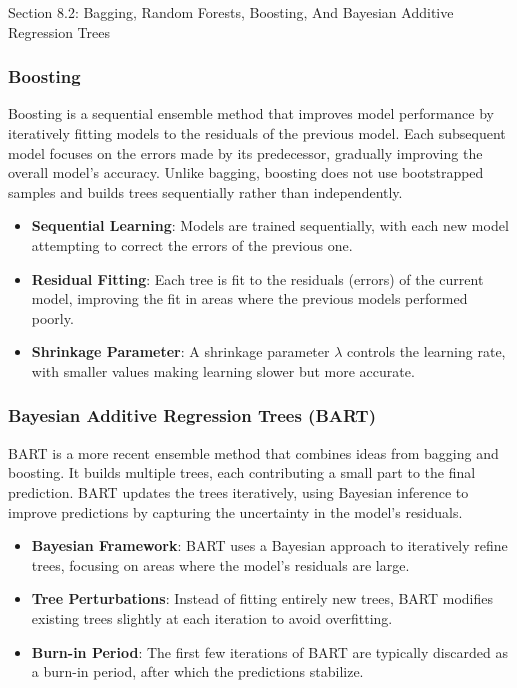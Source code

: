 \begin{notes}{Section 8.2: Bagging, Random Forests, Boosting, And Bayesian Additive Regression Trees}
    \subsubsection*{Boosting}
    
    Boosting is a sequential ensemble method that improves model performance by iteratively fitting models to the residuals of the previous model. Each subsequent model focuses on the errors made by 
    its predecessor, gradually improving the overall model's accuracy. Unlike bagging, boosting does not use bootstrapped samples and builds trees sequentially rather than independently.
    
    \begin{highlight}
        \begin{itemize}
            \item \textbf{Sequential Learning}: Models are trained sequentially, with each new model attempting to correct the errors of the previous one.
            \item \textbf{Residual Fitting}: Each tree is fit to the residuals (errors) of the current model, improving the fit in areas where the previous models performed poorly.
            \item \textbf{Shrinkage Parameter}: A shrinkage parameter \(\lambda\) controls the learning rate, with smaller values making learning slower but more accurate.
        \end{itemize}
    \end{highlight}
    
    \subsubsection*{Bayesian Additive Regression Trees (BART)}
    
    BART is a more recent ensemble method that combines ideas from bagging and boosting. It builds multiple trees, each contributing a small part to the final prediction. BART updates the trees iteratively, 
    using Bayesian inference to improve predictions by capturing the uncertainty in the model's residuals.
    
    \begin{highlight}
        \begin{itemize}
            \item \textbf{Bayesian Framework}: BART uses a Bayesian approach to iteratively refine trees, focusing on areas where the model's residuals are large.
            \item \textbf{Tree Perturbations}: Instead of fitting entirely new trees, BART modifies existing trees slightly at each iteration to avoid overfitting.
            \item \textbf{Burn-in Period}: The first few iterations of BART are typically discarded as a burn-in period, after which the predictions stabilize.
        \end{itemize}
    \end{highlight}
    

\end{notes}

